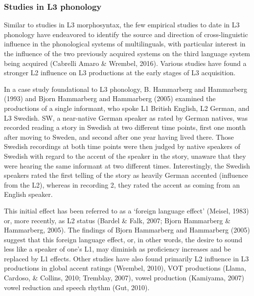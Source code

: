 \documentclass[
  english,
  man]{apa6}
\begin{document}
\hypertarget{studies-in-l3-phonology}{%
\subsubsection{Studies in L3 phonology}\label{studies-in-l3-phonology}}

Similar to studies in L3 morphosyntax, the few empirical studies to date in L3 phonology have endeavored to identify the source and direction of cross-linguistic influence in the phonological systems of multilinguals, with particular interest in the influence of the two previously acquired systems on the third language system being acquired (Cabrelli Amaro \& Wrembel, 2016).
Various studies have found a stronger L2 influence on L3 productions at the early stages of L3 acquisition.

In a case study foundational to L3 phonology, B. Hammarberg and Hammarberg (1993) and Bjorn Hammarberg and Hammarberg (2005) examined the productions of a single informant, who spoke L1 British English, L2 German, and L3 Swedish.
SW, a near-native German speaker as rated by German natives, was recorded reading a story in Swedish at two different time points, first one month after moving to Sweden, and second after one year having lived there.
Those Swedish recordings at both time points were then judged by native speakers of Swedish with regard to the accent of the speaker in the story, unaware that they were hearing the same informant at two different times.
Interestingly, the Swedish speakers rated the first telling of the story as heavily German accented (influence from the L2), whereas in recording 2, they rated the accent as coming from an English speaker.

This initial effect has been referred to as a `foreign language effect' (Meisel, 1983) or, more recently, as L2 status (Bardel \& Falk, 2007; Bjorn Hammarberg \& Hammarberg, 2005).
The findings of Bjorn Hammarberg and Hammarberg (2005) suggest that this foreign language effect, or, in other words, the desire to sound less like a speaker of one's L1, may diminish as proficiency increases and be replaced by L1 effects.
Other studies have also found primarily L2 influence in L3 productions in global accent ratings (Wrembel, 2010), VOT productions (Llama, Cardoso, \& Collins, 2010; Tremblay, 2007), vowel production (Kamiyama, 2007) vowel reduction and speech rhythm (Gut, 2010).
\end{document}
